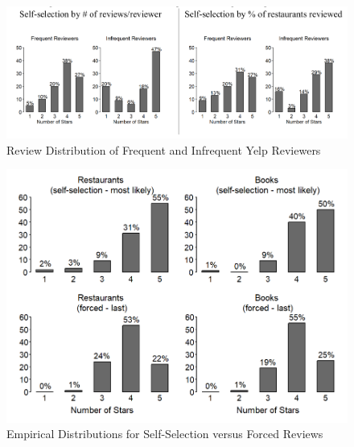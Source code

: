 \begin{figure}[htbp]
  \centering
  \includegraphics[width=1.1\linewidth]{figures/ext/1_frequentInfrequentYelp.png}
  \caption{Review Distribution of Frequent and Infrequent Yelp Reviewers \cite{schoenmuller2018extreme}}
  \label{disp1}
\end{figure}

\begin{figure}[htbp]
  \centering
  \includegraphics[width=1.1\linewidth]{figures/ext/1_selfVSforced.png}
  \caption{Empirical Distributions for Self-Selection versus Forced Reviews \cite{schoenmuller2018extreme}}
  \label{disp2}
\end{figure}